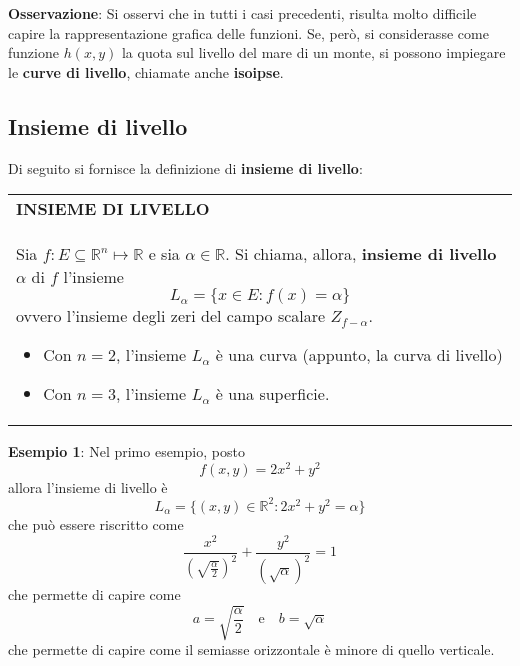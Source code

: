 \documentclass[a4paper]{extarticle}
\renewcommand\arraystretch{}
\begin{document}
\vspace{1em}
\noindent
\textbf{Osservazione}: Si osservi che in tutti i casi precedenti, risulta molto difficile capire la rappresentazione grafica delle funzioni. Se, però, si considerasse come funzione $h(x,y)$ la quota sul livello del mare di un monte, si possono impiegare le \textbf{curve di livello}, chiamate anche \textbf{isoipse}.

\vspace{1em}
\noindent
\subsection{Insieme di livello}
Di seguito si fornisce la definizione di \textbf{insieme di livello}:

\vspace{1em}
\setlength{\tabcolsep}{14pt}
\renewcommand{\arraystretch}{2}
\noindent
\begin{tabularx}{\textwidth}{@{}|P|@{}}
    \hline
    {\textbf{INSIEME DI LIVELLO}}\\
    \parbox{\linewidth}{Sia $f : E \subseteq \mathbb{R}^n \longmapsto \mathbb{R}$ e sia $\alpha \in \mathbb{R}$. Si chiama, allora, \textbf{insieme di livello} $\alpha$ di $f$ l'insieme
    \[\boxed{L_\alpha = \{x \in E : f(x)=\alpha\}}\]
    ovvero l'insieme degli zeri del campo scalare $Z_{f-\alpha}$.
    \begin{itemize}
        \item Con $n=2$, l'insieme $L_\alpha$ è una curva (appunto, la curva di livello)
        \item Con $n=3$, l'insieme $L_\alpha$ è una superficie.
    \end{itemize}
    \vspace{1mm}}\\
    \hline
\end{tabularx}

\vspace{2em}
\noindent
\textbf{Esempio 1}: Nel primo esempio, posto
\[f(x,y)=2x^2+y^2\]
allora l'insieme di livello è
\[L_\alpha = \{(x,y) \in \mathbb{R}^2 : 2x^2+y^2=\alpha\}\]
che può essere riscritto come
\[\frac{x^2}{\left(\sqrt{\frac{\alpha}{2}} \right)^2} + \frac{y^2}{(\sqrt{\alpha})^2}=1\]
che permette di capire come
\[a=\sqrt{\frac{\alpha}{2}} \hspace{1em} \text{e} \hspace{1em} b=\sqrt{\alpha}\]
che permette di capire come il semiasse orizzontale è minore di quello verticale.
\end{document}
